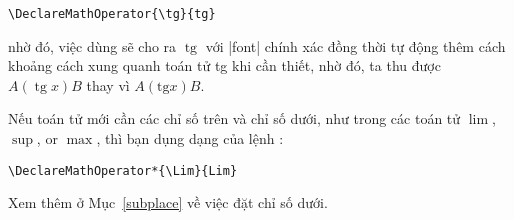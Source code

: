 \documentclass[11pt,leqno,titlepage,openany,oneside]{amsldoc}[1999/12/13]
\DeclareMathOperator{\tg}{tg}
\DeclareMathOperator{\xxx}{xxx}
\begin{document}
\begin{verbatim}
\DeclareMathOperator{\tg}{tg}
\end{verbatim}
nhờ đó, việc dùng  sẽ cho ra $\tg$ với |font| chính xác
đồng thời tự động thêm cách khoảng cách xung quanh toán tử {\upshape tg}
khi cần thiết, nhờ đó, ta thu được $A(\tg x)B$ thay vì $A(\mathrm{tg}x)B$.

\medskip
Nếu toán tử mới cần các chỉ số trên và chỉ số dưới, như trong các toán tử
$\lim$, $\sup$, or $\max$, thì bạn dụng dạng \qc{\*} của lệnh :

\medskip
\begin{verbatim}
\DeclareMathOperator*{\Lim}{Lim}
\end{verbatim}

\medskip\noindent
Xem thêm ở Mục~\ref{subplace} về việc đặt chỉ số dưới.
\end{document}
